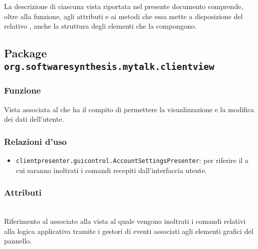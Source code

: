 La descrizione di ciascuna vista riportata nel presente documento comprende, oltre alla funzione, agli attributi e ai metodi che essa mette a disposizione del relativo , anche la struttura degli elementi che la compongono.

\subsection{Package \texttt{org.softwaresynthesis.mytalk.clientview}}

\subsubsection*{Funzione}
Vista associata al   che ha il compito di permettere la visualizzazione e la modifica dei dati dell'utente.

\subsubsection*{Relazioni d'uso}
\begin{itemize}
  \item \texttt{clientpresenter.guicontrol.AccountSettingsPresenter}: per riferire il  a cui saranno inoltrati i comandi recepiti dall'interfaccia utente.
\end{itemize}

\subsubsection*{Attributi}
\begin{description}
  \item{}\\
  Riferimento al  associato alla vista al quale vengono inoltrati i comandi relativi alla logica applicativa tramite i gestori di eventi associati agli elementi grafici del pannello.
\end{description}

